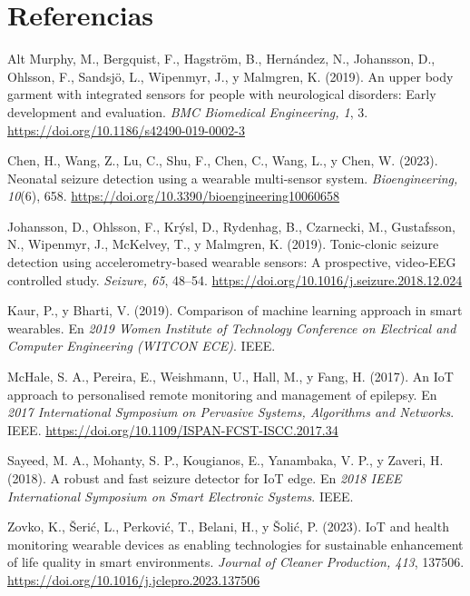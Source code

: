 \documentclass[12pt]{article}
\begin{document}
\newpage
\section{Referencias}
\hangindent=1.27cm Alt Murphy, M., Bergquist, F., Hagström, B., Hernández, N., Johansson, D., Ohlsson, F., Sandsjö, L., Wipenmyr, J., y Malmgren, K. (2019). An upper body garment with integrated sensors for people with neurological disorders: Early development and evaluation. \textit{BMC Biomedical Engineering, 1}, 3. \url{https://doi.org/10.1186/s42490-019-0002-3}

\hangindent=1.27cm Chen, H., Wang, Z., Lu, C., Shu, F., Chen, C., Wang, L., y Chen, W. (2023). Neonatal seizure detection using a wearable multi-sensor system. \textit{Bioengineering, 10}(6), 658. \url{https://doi.org/10.3390/bioengineering10060658}

\hangindent=1.27cm Johansson, D., Ohlsson, F., Krýsl, D., Rydenhag, B., Czarnecki, M., Gustafsson, N., Wipenmyr, J., McKelvey, T., y Malmgren, K. (2019). Tonic-clonic seizure detection using accelerometry-based wearable sensors: A prospective, video-EEG controlled study. \textit{Seizure, 65}, 48--54. \url{https://doi.org/10.1016/j.seizure.2018.12.024}

\hangindent=1.27cm Kaur, P., y Bharti, V. (2019). Comparison of machine learning approach in smart wearables. En \textit{2019 Women Institute of Technology Conference on Electrical and Computer Engineering (WITCON ECE)}. IEEE.

\hangindent=1.27cm McHale, S. A., Pereira, E., Weishmann, U., Hall, M., y Fang, H. (2017). An IoT approach to personalised remote monitoring and management of epilepsy. En \textit{2017 International Symposium on Pervasive Systems, Algorithms and Networks}. IEEE. \url{https://doi.org/10.1109/ISPAN-FCST-ISCC.2017.34}

\hangindent=1.27cm Sayeed, M. A., Mohanty, S. P., Kougianos, E., Yanambaka, V. P., y Zaveri, H. (2018). A robust and fast seizure detector for IoT edge. En \textit{2018 IEEE International Symposium on Smart Electronic Systems}. IEEE.

\hangindent=1.27cm Zovko, K., Šerić, L., Perković, T., Belani, H., y Šolić, P. (2023). IoT and health monitoring wearable devices as enabling technologies for sustainable enhancement of life quality in smart environments. \textit{Journal of Cleaner Production, 413}, 137506. \url{https://doi.org/10.1016/j.jclepro.2023.137506}
\end{document}

